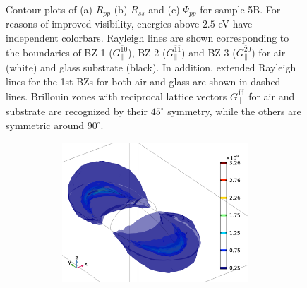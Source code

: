 \begin{figure}[h]
    \caption{Contour plots of (a) $R_{pp}$ (b) $R_{ss}$ and (c) $\Psi_{pp}$ for sample 5B. For reasons of improved visibility, energies above $2.5$ eV have independent colorbars. Rayleigh lines are shown corresponding to the boundaries of BZ-1 ($G_\parallel^{\bar{1}0}$), BZ-2 ($G_\parallel^{\bar{1}\bar{1}}$) and BZ-3 ($G_\parallel^{\bar{2}0}$) for air (white) and glass substrate (black). In addition, extended Rayleigh lines for the 1st BZs for both air and glass are shown in dashed lines. Brillouin zones with reciprocal lattice vectors $G_\parallel^{\bar{1}\bar{1}}$ for air and substrate are recognized by their $45^\circ$ symmetry, while the others are symmetric around $90^\circ$.}
    \label{fig:S5B_contour_RppRss_Psipp}
\end{figure}

\begin{figure}
    \begin{subfigure}{0.5\textwidth}
    \begin{subfigure}{\textwidth}
        \centering
        \includegraphics[width=0.9\linewidth]{figures/ch4/S5B/fielddistr/s5b_normE_TM_wl1010_phi90(2).png}
    \end{subfigure}
    

\end{subfigure}
\end{figure}
